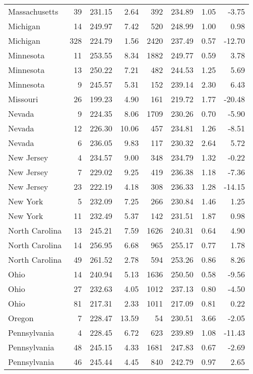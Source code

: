 \begin{longtable}{lrrr@{\extracolsep{10pt}}rrrr}
  Massachusetts &  39 & 231.15 & 2.64 & 392 & 234.89 & 1.05 & -3.75 \\ 
  Michigan &  14 & 249.97 & 7.42 & 520 & 248.99 & 1.00 & 0.98 \\ 
  Michigan & 328 & 224.79 & 1.56 & 2420 & 237.49 & 0.57 & -12.70 \\ 
  Minnesota &  11 & 253.55 & 8.34 & 1882 & 249.77 & 0.59 & 3.78 \\ 
  Minnesota &  13 & 250.22 & 7.21 & 482 & 244.53 & 1.25 & 5.69 \\ 
  Minnesota &   9 & 245.57 & 5.31 & 152 & 239.14 & 2.30 & 6.43 \\ 
  Missouri &  26 & 199.23 & 4.90 & 161 & 219.72 & 1.77 & -20.48 \\ 
  Nevada &   9 & 224.35 & 8.06 & 1709 & 230.26 & 0.70 & -5.90 \\ 
  Nevada &  12 & 226.30 & 10.06 & 457 & 234.81 & 1.26 & -8.51 \\ 
  Nevada &   6 & 236.05 & 9.83 & 117 & 230.32 & 2.64 & 5.72 \\ 
  New Jersey &   4 & 234.57 & 9.00 & 348 & 234.79 & 1.32 & -0.22 \\ 
  New Jersey &   7 & 229.02 & 9.25 & 419 & 236.38 & 1.18 & -7.36 \\ 
  New Jersey &  23 & 222.19 & 4.18 & 308 & 236.33 & 1.28 & -14.15 \\ 
  New York &   5 & 232.09 & 7.25 & 266 & 230.84 & 1.46 & 1.25 \\ 
  New York &  11 & 232.49 & 5.37 & 142 & 231.51 & 1.87 & 0.98 \\ 
  North Carolina &  13 & 245.21 & 7.59 & 1626 & 240.31 & 0.64 & 4.90 \\ 
  North Carolina &  14 & 256.95 & 6.68 & 965 & 255.17 & 0.77 & 1.78 \\ 
  North Carolina &  49 & 261.52 & 2.78 & 594 & 253.26 & 0.86 & 8.26 \\ 
  Ohio &  14 & 240.94 & 5.13 & 1636 & 250.50 & 0.58 & -9.56 \\ 
  Ohio &  27 & 232.63 & 4.05 & 1012 & 237.13 & 0.80 & -4.50 \\ 
  Ohio &  81 & 217.31 & 2.33 & 1011 & 217.09 & 0.81 & 0.22 \\ 
  Oregon &   7 & 228.47 & 13.59 &  54 & 230.51 & 3.66 & -2.05 \\ 
  Pennsylvania &   4 & 228.45 & 6.72 & 623 & 239.89 & 1.08 & -11.43 \\ 
  Pennsylvania &  48 & 245.15 & 4.33 & 1681 & 247.83 & 0.67 & -2.69 \\ 
  Pennsylvania &  46 & 245.44 & 4.45 & 840 & 242.79 & 0.97 & 2.65 \\ 

\end{longtable}
